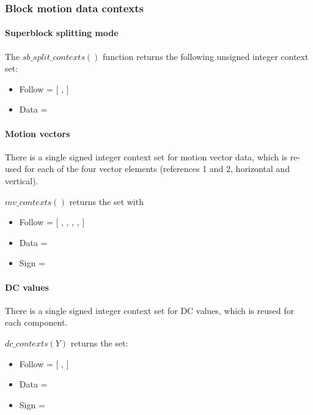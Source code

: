 \subsubsection{Block motion data contexts}

\paragraph{Superblock splitting mode\\}

The $sb\_split\_contexts()$ function returns the following unsigned integer context set:

\begin{itemize}
\item Follow = [ \SBSplitFollowOne, \SBSplitFollowTwo ]
\item Data = \SBSplitData
\end{itemize}

\paragraph{Motion vectors\\}
\label{mvcontexts}

There is a single signed integer context set for motion vector data, which is re-used for each of the four vector elements
(references 1 and 2, horizontal and vertical).

$mv\_contexts()$ returns the set with
\begin{itemize}
\item Follow = [ \VectorFollowOne, \VectorFollowTwo, \VectorFollowThree, \VectorFollowFour, \VectorFollowFivePlus ]
\item Data = \VectorData
\item Sign = \VectorSign
\end{itemize}

\paragraph{DC values \\}
\label{dcvaluecontexts}

There is a single signed integer context set for DC values, which is reused for each component. 

$dc\_contexts(Y)$ returns the set:

\begin{itemize}
\item Follow = [ \DCFollowOne, \DCFollowTwoPlus ]
\item Data = \DCData
\item Sign = \DCSign
\end{itemize}

